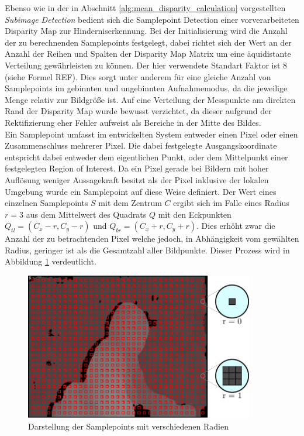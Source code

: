 \noindent
Ebenso wie in der in Abschnitt \ref{alg:mean_disparity_calculation} vorgestellten \emph{Subimage Detection} bedient sich die Samplepoint Detection einer vorverarbeiteten Disparity Map zur Hinderniserkennung. Bei der Initialisierung wird die Anzahl der zu berechnenden Samplepoints festgelegt, dabei richtet sich der Wert an der Anzahl der Reihen und Spalten der Disparity Map Matrix um eine äquidistante Verteilung gewährleisten zu können. Der hier verwendete Standart Faktor ist 8 (siehe Formel REF). Dies sorgt unter anderem für eine gleiche Anzahl von Samplepoints im gebinnten und ungebinnten Aufnahmemodus, da die jeweilige Menge relativ zur Bildgröße ist. Auf eine Verteilung der Messpunkte am direkten Rand der Disparity Map wurde bewusst verzichtet, da dieser aufgrund der Rektifizierung eher Fehler aufweist als Bereiche in der Mitte des Bildes.\\

\noindent
Ein Samplepoint umfasst im entwickelten System entweder einen Pixel oder einen Zusammenschluss mehrerer Pixel. Die dabei festgelegte Ausgangskoordinate entspricht dabei entweder dem eigentlichen Punkt, oder dem Mittelpunkt einer festgelegten Region of Interest. Da ein Pixel gerade bei Bildern mit hoher Auflösung weniger Aussagekraft besitzt als der Pixel inklusive der lokalen Umgebung wurde ein Samplepoint auf diese Weise definiert. Der Wert eines einzelnen Samplepoints $S$ mit dem Zentrum $C$ ergibt sich im Falle eines Radius $r=3$ aus dem Mittelwert des Quadrats $Q$ mit den Eckpunkten $Q_{tl} = (C_x - r, C_y -r)$ und $Q_{br} = (C_x + r, C_y +r)$. Dies erhöht zwar die Anzahl der zu betrachtenden Pixel welche jedoch, in Abhängigkeit vom gewählten Radius, geringer ist als die Gesamtzahl aller Bildpunkte. Dieser Prozess wird in Abbildung \ref{fig:samplepoints_initmodes} verdeutlicht.\\

\begin{figure}[h]
	\begin{center}
		\includegraphics[width=10cm]{img/samplepoints_initmodes.pdf}
	\end{center}
	\caption{Darstellung der Samplepoints mit verschiedenen Radien}
	\label{fig:samplepoints_initmodes}
\end{figure}


